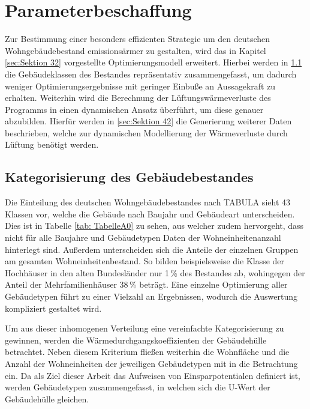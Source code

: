 \chapter{Parameterbeschaffung}

Zur Bestimmung einer besonders effizienten Strategie um den deutschen Wohngebäudebestand emissionsärmer zu gestalten, wird das in Kapitel \ref{sec:Sektion 32} vorgestellte Optimierungsmodell erweitert.
Hierbei werden in \ref{sec:Sektion 41} die Gebäudeklassen des Bestandes repräsentativ zusammengefasst, um dadurch weniger Optimierungsergebnisse mit geringer Einbuße an Aussagekraft zu erhalten.
Weiterhin wird die Berechnung der Lüftungswärmeverluste des Programms in einen dynamischen Ansatz überführt, um diese genauer abzubilden.
Hierfür werden in \ref{sec:Sektion 42} die Generierung weiterer Daten beschrieben, welche zur dynamischen Modellierung der Wärmeverluste durch Lüftung benötigt werden.

\section{Kategorisierung des Gebäudebestandes}
\label{sec:Sektion 41}

Die Einteilung des deutschen Wohngebäudebestandes nach TABULA sieht 43 Klassen vor, welche die Gebäude nach Baujahr und Gebäudeart unterscheiden.
Dies ist in Tabelle \ref{tab: TabelleA0} zu sehen, aus welcher zudem hervorgeht, dass nicht für alle Baujahre und Gebäudetypen Daten der Wohneinheitenanzahl hinterlegt sind.
Außerdem unterscheiden sich die Anteile der einzelnen Gruppen am gesamten Wohneinheitenbestand.
So bilden beispielsweise die Klasse der Hochhäuser in den alten Bundesländer nur 1\,\% des Bestandes ab, wohingegen der Anteil der Mehrfamilienhäuser 38\,\% beträgt.
Eine einzelne Optimierung aller Gebäudetypen führt zu einer Vielzahl an Ergebnissen, wodurch die Auswertung kompliziert gestaltet wird.

Um aus dieser inhomogenen Verteilung eine vereinfachte Kategorisierung zu gewinnen, werden die Wärmedurchgangskoeffizienten der Gebäudehülle betrachtet.
Neben diesem Kriterium fließen weiterhin die Wohnfläche und die Anzahl der Wohneinheiten der jeweiligen Gebäudetypen mit in die Betrachtung ein.
Da als Ziel dieser Arbeit das Aufweisen von Einsparpotentialen definiert ist, werden Gebäudetypen zusammengefasst, in welchen sich die U-Wert der Gebäudehülle gleichen.

